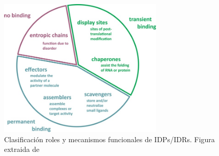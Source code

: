 \begin{figure}[h!,centered]
\centering
\includegraphics[width=0.7\textwidth]{img/idpFunctionMechanisms.jpg} 
\caption{Clasificación roles y mecanismos funcionales de IDPs/IDRs. Figura extraida de \cite{van2014classification}}
\label{idpFunctions}
\end{figure}




